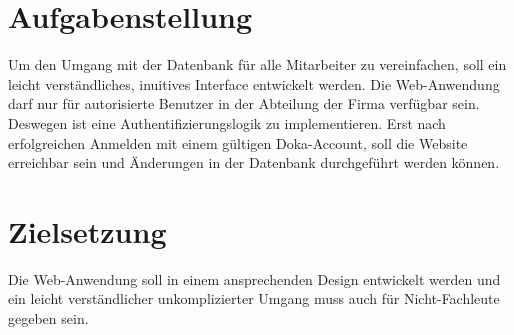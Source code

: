 \clearpage

\section{Aufgabenstellung}
Um den Umgang mit der Datenbank für alle Mitarbeiter zu vereinfachen, soll ein leicht verständliches, inuitives Interface entwickelt werden.
Die Web-Anwendung darf nur für autorisierte Benutzer in der Abteilung der Firma verfügbar sein. Deswegen ist eine Authentifizierungslogik zu 
implementieren. Erst nach erfolgreichen Anmelden mit einem gültigen Doka-Account, soll die Website erreichbar sein und Änderungen in der Datenbank
durchgeführt werden können.


\section{Zielsetzung}
Die Web-Anwendung soll in einem ansprechenden Design entwickelt werden und ein
leicht verständlicher unkomplizierter Umgang muss auch für Nicht-Fachleute gegeben
sein. 

